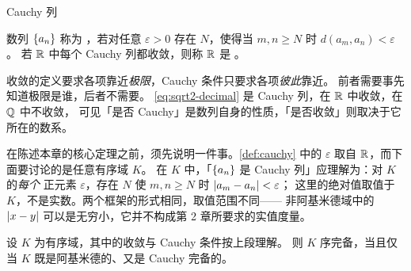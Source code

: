 \begin{concept}{Cauchy 列}
\end{concept}

\begin{definition}[Cauchy 列]
  \label{def:cauchy}
  数列 \(\{a_{n}\}\) 称为 ，若对任意
  \(\varepsilon > 0\) 存在 \(N\)，使得当 \(m, n \ge N\) 时 \(d(a_{m}, a_{n}) < \varepsilon\)。
  若 \(\mathbb{R}\) 中每个 Cauchy 列都收敛，则称 \(\mathbb{R}\) 是 。
\end{definition}

\begin{intuition}
  收敛的定义要求各项靠近\emph{极限}，Cauchy 条件只要求各项\emph{彼此}靠近。
  前者需要事先知道极限是谁，后者不需要。
  \cref{eq:sqrt2-decimal} 是 Cauchy 列，在 \(\mathbb{R}\) 中收敛，在 \(\mathbb{Q}\) 中不收敛，
  可见「是否 Cauchy」是数列自身的性质，「是否收敛」则取决于它所在的数系。
\end{intuition}

在陈述本章的核心定理之前，须先说明一件事。\cref{def:cauchy} 中的
\(\varepsilon\) 取自 \(\mathbb{R}\)，而下面要讨论的是任意有序域 \(K\)。
在 \(K\) 中，「\(\{a_{n}\}\) 是 Cauchy 列」应理解为：对 \(K\) 的\emph{每个}
正元素 \(\varepsilon\)，存在 \(N\) 使 \(m,n \ge N\) 时 \(\lvert a_{m}-a_{n}\rvert < \varepsilon\)；
这里的绝对值取值于 \(K\)，不是实数。两个框架的形式相同，取值范围不同——
非阿基米德域中的 \(\lvert x-y\rvert\) 可以是无穷小，它并不构成第 2 章所要求的实值度量。

\begin{theorem}[完备性的分解]
  \label{thm:completeness-split}
  设 \(K\) 为有序域，其中的收敛与 Cauchy 条件按上段理解。
  则 \(K\) 序完备，当且仅当 \(K\) 既是阿基米德的、又是 Cauchy 完备的。
\end{theorem}

